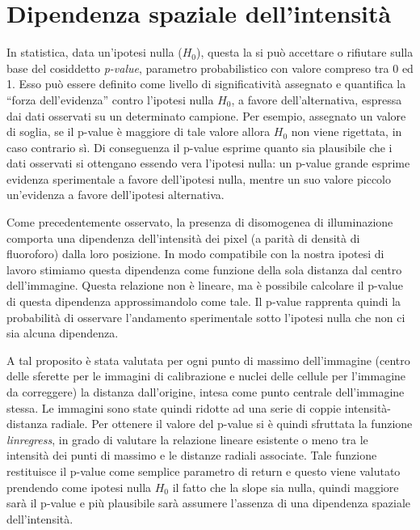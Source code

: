 \section{Dipendenza spaziale dell'intensità}

In statistica, data un'ipotesi nulla ($H_0$), questa la si può accettare o rifiutare sulla base del cosiddetto \textit{p-value}, parametro probabilistico con valore compreso tra 0 ed 1.
Esso può essere definito come livello di significatività assegnato e quantifica la ``forza dell'evidenza'' contro l'ipotesi nulla $H_0$, a favore dell'alternativa, espressa dai dati osservati su un determinato campione. 
Per esempio, assegnato un valore di soglia, se il p-value è maggiore di tale valore allora $H_0$ non viene rigettata, in caso contrario sì.
Di conseguenza il p-value esprime quanto sia plausibile che i dati osservati si ottengano essendo vera l’ipotesi nulla: un p-value grande esprime evidenza sperimentale a favore dell'ipotesi nulla, mentre un suo valore piccolo un'evidenza a favore dell'ipotesi alternativa.

Come precedentemente osservato, la presenza di disomogenea di illuminazione comporta una dipendenza dell'intensità dei pixel (a parità di densità di fluoroforo) dalla loro posizione.
In modo compatibile con la nostra ipotesi di lavoro stimiamo questa dipendenza come funzione della sola distanza dal centro dell'immagine.
Questa relazione non è lineare, ma è possibile calcolare il p-value di questa dipendenza approssimandolo come tale.
Il p-value rapprenta quindi la probabilità di osservare l'andamento sperimentale sotto l'ipotesi nulla che non ci sia alcuna dipendenza.

A tal proposito è stata valutata per ogni punto di massimo dell'immagine (centro delle sferette per le immagini di calibrazione e nuclei delle cellule per l'immagine da correggere) la distanza dall'origine, intesa come punto centrale dell'immagine stessa.
Le immagini sono state quindi ridotte ad una serie di coppie intensità-distanza radiale.
Per ottenere il valore del p-value si è quindi sfruttata la funzione \textit{linregress}, in grado di valutare la relazione lineare esistente o meno tra le intensità dei punti di massimo e le distanze radiali associate.
Tale funzione restituisce il p-value come semplice parametro di return e questo viene valutato prendendo come ipotesi nulla $H_0$ il fatto che la slope sia nulla, quindi maggiore sarà il p-value e più plausibile sarà assumere l'assenza di una dipendenza spaziale dell'intensità.

